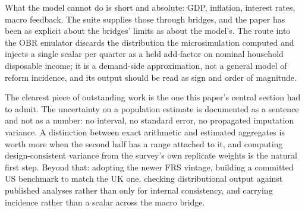 What the model cannot do is short and absolute: GDP, inflation, interest rates, macro feedback. The suite supplies those through bridges, and the paper has been as explicit about the bridges' limits as about the model's. The route into the OBR emulator discards the distribution the microsimulation computed and injects a single scalar per quarter as a held add-factor on nominal household disposable income; it is a demand-side approximation, not a general model of reform incidence, and its output should be read as sign and order of magnitude.

The clearest piece of outstanding work is the one this paper's central section had to admit. The uncertainty on a population estimate is documented as a sentence and not as a number: no interval, no standard error, no propagated imputation variance. A distinction between exact arithmetic and estimated aggregates is worth more when the second half has a range attached to it, and computing design-consistent variance from the survey's own replicate weights is the natural first step. Beyond that: adopting the newer FRS vintage, building a committed US benchmark to match the UK one, checking distributional output against published analyses rather than only for internal consistency, and carrying incidence rather than a scalar across the macro bridge.
